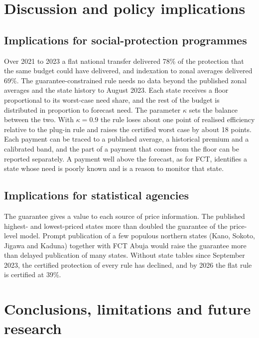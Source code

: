 \documentclass[preprint,12pt,number]{elsarticle}%
\theoremstyle{definition}
\theoremstyle{remark}
\begin{document}
\section{Discussion and policy implications}\label{sec:discussion}

\subsection{Implications for social-protection programmes}

Over 2021 to 2023 a flat national transfer delivered 78\% of the protection that the same budget could have delivered, and indexation to zonal averages delivered 69\%. The guarantee-constrained rule needs no data beyond the published zonal averages and the state history to August 2023. Each state receives a floor proportional to its worst-case need share, and the rest of the budget is distributed in proportion to forecast need. The parameter $\kappa$ sets the balance between the two. With $\kappa=0.9$ the rule loses about one point of realised efficiency relative to the plug-in rule and raises the certified worst case by about 18 points. Each payment can be traced to a published average, a historical premium and a calibrated band, and the part of a payment that comes from the floor can be reported separately. A payment well above the forecast, as for FCT, identifies a state whose need is poorly known and is a reason to monitor that state.

\subsection{Implications for statistical agencies}

The guarantee gives a value to each source of price information. The published highest- and lowest-priced states more than doubled the guarantee of the price-level model. Prompt publication of a few populous northern states (Kano, Sokoto, Jigawa and Kaduna) together with FCT Abuja would raise the guarantee more than delayed publication of many states. Without state tables since September 2023, the certified protection of every rule has declined, and by 2026 the flat rule is certified at 39\%.

\section{Conclusions, limitations and future research}\label{sec:conclusion}
\end{document}
